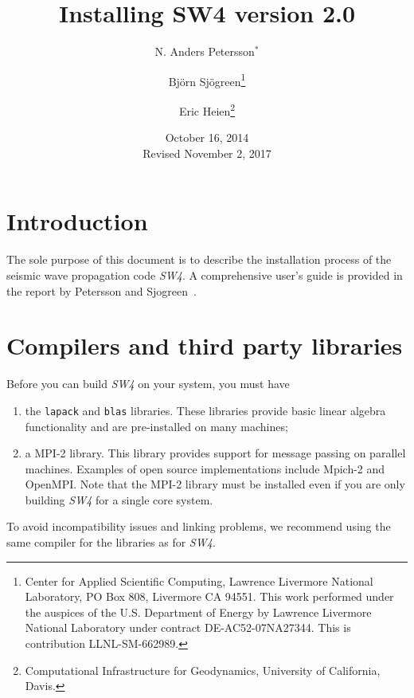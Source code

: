 \documentclass[11pt]{article}
\begin{document}
\title{Installing SW4 version 2.0}

\author{ N. Anders Petersson$^*$ \and Bj\"orn Sj\"ogreen\thanks{Center for Applied Scientific
    Computing, Lawrence Livermore National Laboratory, PO Box 808, Livermore CA 94551. This work
    performed under the auspices of the U.S. Department of Energy by Lawrence Livermore National
    Laboratory under contract DE-AC52-07NA27344. This is contribution LLNL-SM-662989.} \and Eric
  Heien\thanks{Computational Infrastructure for Geodynamics, University of California, Davis.}}
\date{October 16, 2014\\Revised November 2, 2017}
\maketitle




\tableofcontents

\section{Introduction}
The sole purpose of this document is to describe the installation process of the seismic wave
propagation code \emph{SW4}. A comprehensive user's guide is provided in the report by
Petersson and Sjogreen~\cite{SW4-11}.

\section{Compilers and third party libraries}

Before you can build \emph{SW4} on your system, you must have
\begin{enumerate}
\item the \verb+lapack+ and \verb+blas+ libraries. These libraries provide basic linear algebra
  functionality and are pre-installed on many machines;
\item a MPI-2 library. This library provides support for message passing on parallel
  machines. Examples of open source implementations include Mpich-2 and OpenMPI. Note that the MPI-2
  library must be installed even if you are only building \emph{SW4} for a single core system.
\end{enumerate}
To avoid incompatibility issues and linking problems, we recommend using the same compiler for
the libraries as for \emph{SW4}.
\end{document}

